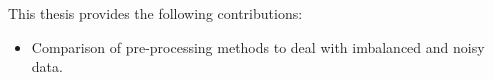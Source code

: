 This thesis provides the following contributions:
\begin{itemize}

\item Comparison of pre-processing methods to deal with imbalanced and noisy data.


\end{itemize}
